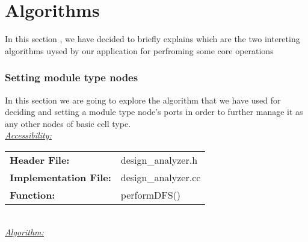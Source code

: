 \documentclass{article}
\newcommand{\sectionbreak}{\clearpage}
\begin{document}
\sectionbreak{\clearpage}


\part{Algorithms}

In this section , we have decided to briefly explains which are the two intereting algorithms uysed by our application for perfroming some core operations\\


\section{Setting module type nodes}

In this section we are going to explore the algorithm that we have used for deciding and setting a module type node's ports in order to further manage it as any other nodes of basic cell type.\\

\underline{\textit{\underline{Accessibility: }}}\\

\begin{tabular}{ll}
	\textbf{Header File: } & design\_analyzer.h\\
	\textbf{Implementation File: } & design\_analyzer.cc\\
	\textbf{Function: } & performDFS()\\
\end{tabular}\\

\underline{\textit{\underline{Algorithm: }}}\\
\end{document}
